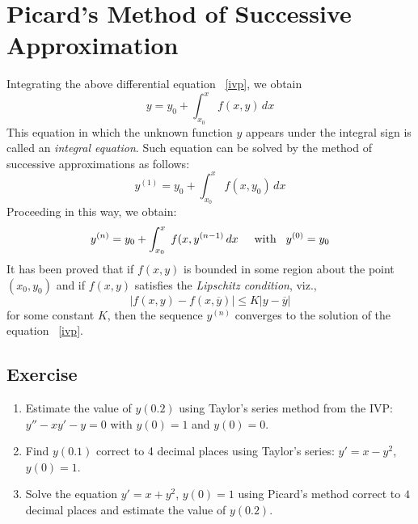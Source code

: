 \documentclass[aima203_lecturenotes_ku.tex]{subfiles}
\begin{document}
\section{Picard's Method of Successive Approximation}
Integrating the above differential equation ~\ref{ivp}, we obtain
\begin{equation}
  \label{picard1}
  y = y_0 + \int_{x_0}^x \; f(x,y)\,dx
\end{equation}
This equation in which the unknown function $y$ appears under the integral sign is called an \textit{integral equation}. Such equation can be solved by the method of successive approximations as follows:
\begin{equation}
  \label{picard2}
  y^{(1)} = y_0 + \int_{x_0}^x \; f(x,y_0)\,dx
\end{equation}
Proceeding in this way, we obtain:
\begin{equation}
  \label{picardit}
    y^{(n)} = y_0 + \int_{x_0}^x \; f(x,y^{(n-1)}\,dx \hspace{5mm} \text{with} \hspace{3mm}  y^{(0)} = y_0
\end{equation}
It has been proved that if $f(x,y)$ is bounded in some region about the point $(x_0, y_0)$ and if $f(x,y)$ satisfies the \textit{Lipschitz condition}, viz.,
\begin{equation*}
  |f(x,y)-f(x,\overline{y})| \leq K |y - \overline{y}|
\end{equation*}
for some constant $K$, then the sequence $y^{(n)}$ converges to the solution of the equation ~\ref{ivp}.

\subsection{Exercise}
\begin{enumerate}
\item Estimate the value of $y(0.2)$ using Taylor's series method from the IVP:  \\ $\displaystyle y'' -xy' -y = 0$ with $y(0) = 1$ and $y(0) =0$.

\item Find $y(0.1)$ correct to 4 decimal places using Taylor's series: $y'=x-y^2$, $y(0)=1$.

\item Solve the equation $y' = x+ y^2$, $y(0) = 1$ using Picard's method correct to $4$ decimal places and estimate the value of $y(0.2)$.
\end{enumerate}
\end{document}
